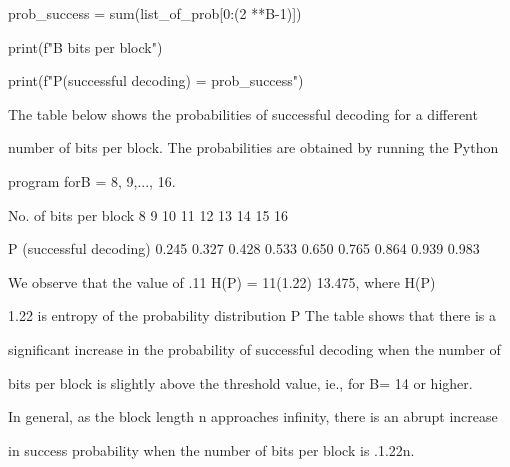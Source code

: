 prob_success = sum(list_of_prob[0:(2 **B-1)])

print(f"{B} bits per block")

print(f"P(successful decoding) = {prob_success}")

The table below shows the probabilities of successful decoding for a different

number of bits per block. The probabilities are obtained by running the Python

program forB = 8, 9,..., 16.

No. of bits per block 8 9 10 11 12 13 14 15 16

P (successful decoding) 0.245 0.327 0.428 0.533 0.650 0.765 0.864 0.939 0.983

We observe that the value of .11 \cdot H(P) = 11(1.22) 13.475, where H(P)

1.22 is entropy of the probability distribution P The table shows that there is a

significant increase in the probability of successful decoding when the number of

bits per block is slightly above the threshold value, ie., for B= 14 or higher.

In general, as the block length n approaches infinity, there is an abrupt increase

in success probability when the number of bits per block is .1.22n.
